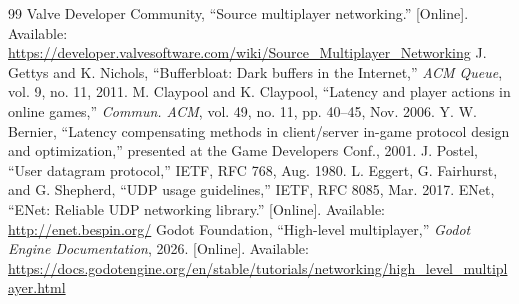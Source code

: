 \documentclass[11pt]{article}
\begin{document}
\begin{thebibliography}{99}
 Valve Developer Community, ``Source multiplayer networking.'' [Online]. Available: \url{https://developer.valvesoftware.com/wiki/Source_Multiplayer_Networking}
 J. Gettys and K. Nichols, ``Bufferbloat: Dark buffers in the Internet,'' \emph{ACM Queue}, vol. 9, no. 11, 2011.
 M. Claypool and K. Claypool, ``Latency and player actions in online games,'' \emph{Commun. ACM}, vol. 49, no. 11, pp. 40--45, Nov. 2006.
 Y. W. Bernier, ``Latency compensating methods in client/server in-game protocol design and optimization,'' presented at the Game Developers Conf., 2001.
 J. Postel, ``User datagram protocol,'' IETF, RFC 768, Aug. 1980.
 L. Eggert, G. Fairhurst, and G. Shepherd, ``UDP usage guidelines,'' IETF, RFC 8085, Mar. 2017.
 ENet, ``ENet: Reliable UDP networking library.'' [Online]. Available: \url{http://enet.bespin.org/} %
 Godot Foundation, ``High-level multiplayer,'' \emph{Godot Engine Documentation}, 2026. [Online]. Available: \url{https://docs.godotengine.org/en/stable/tutorials/networking/high_level_multiplayer.html} %
\end{thebibliography}
\end{document}
